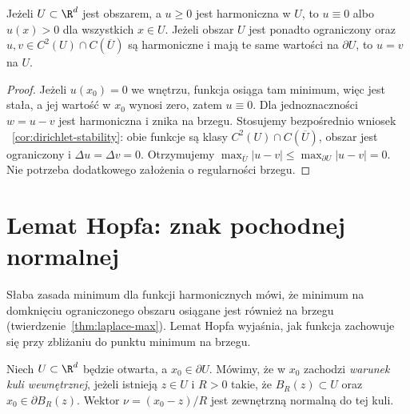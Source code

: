 \begin{wniosek}
\label{cor:pde14-positive}
Jeżeli $U\subset\R^d$ jest obszarem, a $u\ge0$ jest harmoniczna w $U$,
to $u\equiv0$ albo $u(x)>0$ dla wszystkich $x\in U$.
Jeżeli obszar $U$ jest ponadto ograniczony oraz
$u,v\in C^2(U)\cap C(\overline U)$ są harmoniczne i mają
te same wartości na $\partial U$, to $u=v$ na $U$.
\end{wniosek}
\begin{proof}
Jeżeli $u(x_0)=0$ we wnętrzu, funkcja osiąga tam minimum,
więc jest stała, a jej wartość w $x_0$ wynosi zero,
zatem $u\equiv0$.
Dla jednoznaczności $w=u-v$ jest harmoniczna i znika na
brzegu. Stosujemy bezpośrednio wniosek
~\ref{cor:dirichlet-stability}: obie funkcje są klasy
$C^2(U)\cap C(\overline U)$, obszar jest ograniczony
i $\Delta u=\Delta v=0$. Otrzymujemy
$\max_{\overline U}|u-v|\le\max_{\partial U}|u-v|=0$.
Nie potrzeba dodatkowego założenia o regularności brzegu.
\end{proof}

\section{Lemat Hopfa: znak pochodnej normalnej}
\label{sec:pde14-hopf}
Słaba zasada minimum dla funkcji harmonicznych mówi,
że minimum na domknięciu ograniczonego obszaru osiągane
jest również na brzegu (twierdzenie~\ref{thm:laplace-max}). Lemat Hopfa wyjaśnia, jak funkcja zachowuje się
przy zbliżaniu do punktu minimum na brzegu.

\begin{definicja}
Niech $U\subset\R^d$ będzie otwarta, a $x_0\in\partial U$.
Mówimy, że w $x_0$ zachodzi \emph{warunek kuli wewnętrznej},
jeżeli istnieją $z\in U$ i $R>0$ takie, że
$B_R(z)\subset U$ oraz $x_0\in\partial B_R(z)$.
Wektor $\nu=(x_0-z)/R$ jest zewnętrzną normalną do tej kuli.
\end{definicja}

